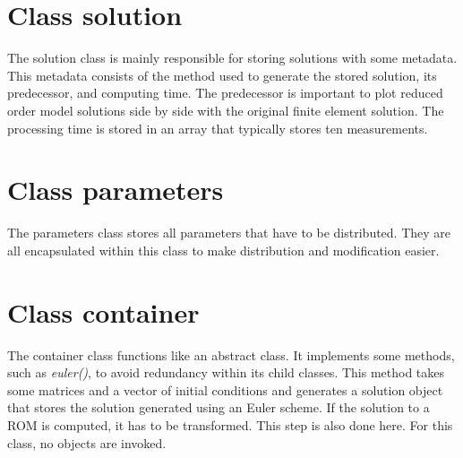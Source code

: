 \section{Class solution}
The solution class is mainly responsible for storing solutions with some metadata.
This metadata consists of the method used to generate the stored solution, its predecessor, and computing time.
The predecessor is important to plot reduced order model solutions side by side with the original finite element solution.
The processing time is stored in an array that typically stores ten measurements.

\section{Class parameters}
The parameters class stores all parameters that have to be distributed.
They are all encapsulated within this class to make distribution and modification easier.

\section{Class container}
The container class functions like an abstract class.
It implements some methods, such as \textit{euler()}, to avoid redundancy within its child classes.
This method takes some matrices and a vector of initial conditions and generates a solution object that stores the solution generated using an Euler scheme.
If the solution to a ROM is computed, it has to be transformed.
This step is also done here.
For this class, no objects are invoked.

